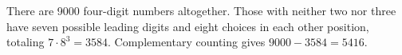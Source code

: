 There are 9000 four-digit numbers altogether. Those with neither two nor three have seven possible leading digits and eight choices in each other position, totaling $7\cdot8^3=3584$. Complementary counting gives $9000-3584=\boxed{5416}$.

